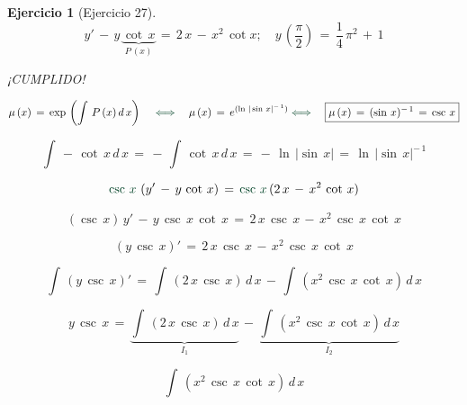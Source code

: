 \documentclass[a4paper,11pt]{book}
\newtheorem{ejer}{Ejercicio}[section]
\begin{document}
  

\begin{ejer}[Ejercicio 27] 

$$y'\,-\,y\,\underbrace{\cot\,x}_{P\,(x)}\,=\,2\,x\,-\,x^{2}\,\cot{x}; \quad y\,\left(\dfrac{\pi}{2} \right)\,=\,\dfrac{1}{4}\,\pi^{2}\,+\,1$$ 

  



  

¡CUMPLIDO! 

  


  

 $$\mu\,(x)\,=\,\exp\,\left(\int\,P\,(x)\,d\,x \right) \quad \textcolor{britishracinggreen}{\iff} \quad \mu\,(x)\,=\,e^{(\ln\,|\sin\,x|^{-\,1})} \textcolor{britishracinggreen}{\iff} \quad \boxed{\mu\,(x)\,=\,(\sin\,x)^{-\,1}\,=\,\csc\,x}$$ 

  

$$\int\,-\,\cot\,x\,d\,x\,=\,-\,\int\,\cot\,x\,d\,x\,=\,-\,\ln\,|\sin\,x|\,=\,\boxed{\ln\,|\sin\,x|^{-\,1}}$$ 

  

 $$\textcolor{britishracinggreen}{\csc\,x}\,\left(y'\,-\,y\,\cot\,x \right)\,=\,\textcolor{britishracinggreen}{\csc\,x}\,(2\,x\,-\,x^{2}\,\cot\,x) $$ 

  

$$(\csc\,x)\,y'\,-\,y\,\csc\,x\,\cot\,x\,=\,2\,x\,\csc\,x\,-\,x^{2}\,\csc\,x\,\cot\,x$$ 

  

$$\left(y\,\csc\,x \right)'\,=\,2\,x\,\csc\,x\,-\,x^{2}\,\csc\,x\,\cot\,x $$ 

  

 $$\int\,\left(y\,\csc\,x \right)'\,=\,\int\,\left( 2\,x\,\csc\,x \right)\,d\,x\,-\,\int\,\left(x^{2}\,\csc\,x\,\cot\,x \right)\,d\,x$$ 

  

$$y\,\csc\,x\,=\,\underbrace{\int\,\left( 2\,x\,\csc\,x \right)\,d\,x}_{I_{1}}\,-\,\underbrace{\int\,\left(x^{2}\,\csc\,x\,\cot\,x \right)\,d\,x}_{I_{2}}$$ 

  

\begin{tcolorbox}[colback=red!5!white,colframe=red!75!black,fonttitle=\bfseries,title=$I_{2}$]  

  

$$\int\,\left(x^{2}\,\csc\,x\,\cot\,x \right)\,d\,x$$ 

  


\end{tcolorbox}
\end{ejer}
\end{document}
